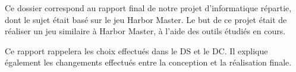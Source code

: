 
Ce dossier correspond au rapport final de notre projet d'informatique répartie, dont le sujet était basé sur le jeu Harbor Master. Le but de ce projet était de réaliser un jeu similaire à Harbor Master, à l'aide des outils étudiés en cours.

 Ce rapport rappelera les choix effectués dans le DS et le DC. Il explique également les changements effectués entre la conception et la réalisation finale. 